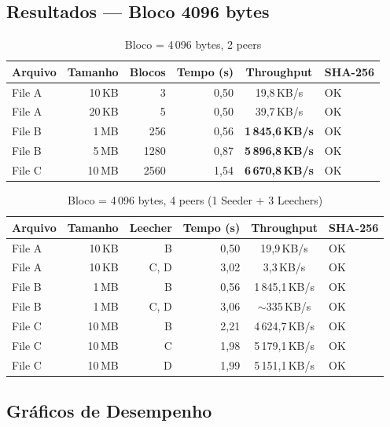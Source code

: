 \documentclass[12pt,a4paper]{article}
\begin{document}
\subsection{Resultados --- Bloco 4096 bytes}

\begin{table}[H]
\centering
\caption{Bloco = 4\,096 bytes, 2 peers}
\label{tab:4096_2p}
\begin{tabular}{lrrrc}
\toprule
Arquivo & Tamanho & Blocos & Tempo (s) & Throughput & SHA-256 \\
\midrule
File A & 10\,KB  &    3 & 0,50 &  19,8\,KB/s & OK \\
File A & 20\,KB  &    5 & 0,50 &  39,7\,KB/s & OK \\
File B &  1\,MB  &  256 & 0,56 &\textbf{1\,845,6\,KB/s} & OK \\
File B &  5\,MB  & 1280 & 0,87 &\textbf{5\,896,8\,KB/s} & OK \\
File C & 10\,MB  & 2560 & 1,54 &\textbf{6\,670,8\,KB/s} & OK \\
\bottomrule
\end{tabular}
\end{table}

\begin{table}[H]
\centering
\caption{Bloco = 4\,096 bytes, 4 peers (1 Seeder + 3 Leechers)}
\label{tab:4096_4p}
\begin{tabular}{lrrrc}
\toprule
Arquivo & Tamanho & Leecher & Tempo (s) & Throughput & SHA-256 \\
\midrule
File A & 10\,KB & B &   0,50 &  19,9\,KB/s & OK \\
File A & 10\,KB & C, D &   3,02 &   3,3\,KB/s & OK \\
File B &  1\,MB & B &   0,56 & 1\,845,1\,KB/s & OK \\
File B &  1\,MB & C, D &   3,06 & $\sim$335\,KB/s & OK \\
File C & 10\,MB & B & 2,21 & 4\,624,7\,KB/s & OK \\
File C & 10\,MB & C & 1,98 & 5\,179,1\,KB/s & OK \\
File C & 10\,MB & D & 1,99 & 5\,151,1\,KB/s & OK \\
\bottomrule
\end{tabular}
\end{table}

\subsection{Gráficos de Desempenho}
\end{document}

